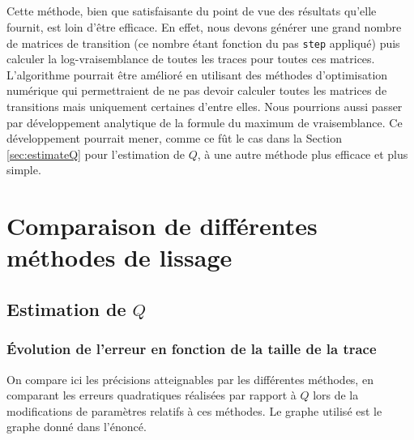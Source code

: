 \documentclass[a4paper,titlepage]{report}
\begin{document}
\paragraph{}
Cette méthode, bien que satisfaisante du point de vue des résultats qu'elle fournit, est loin d'être efficace. En effet, nous devons générer une grand nombre de matrices de transition (ce nombre étant fonction du pas \texttt{step} appliqué) puis calculer la log-vraisemblance de toutes les traces pour toutes ces matrices. L'algorithme pourrait être amélioré en utilisant des méthodes d'optimisation numérique qui permettraient de ne pas devoir calculer toutes les matrices de transitions mais uniquement certaines d'entre elles. Nous pourrions aussi passer par développement analytique de la formule du maximum de vraisemblance. Ce développement pourrait mener, comme ce fût le cas dans la Section \ref{sec:estimateQ} pour l'estimation de $Q$, à une autre méthode plus efficace et plus simple.
\appendix

\chapter{Comparaison de différentes méthodes de lissage}

\section{Estimation de $Q$}
	\subsection{Évolution de l'erreur en fonction de la taille de la trace}

On compare ici les précisions atteignables par les différentes méthodes, en comparant les erreurs quadratiques réalisées par rapport à $Q$ lors de la modifications de paramètres relatifs à ces méthodes. Le graphe utilisé est le graphe donné dans l'énoncé.
\end{document}
